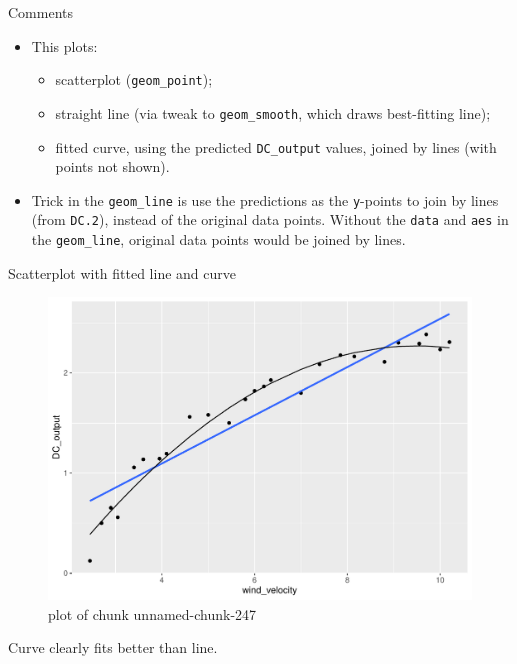 \documentclass[ignorenonframetext,]{beamer}
\providecommand{\tightlist}{%
  \setlength{\itemsep}{0pt}\setlength{\parskip}{0pt}}
\begin{document}
\begin{frame}[fragile]{Comments}
\protect\hypertarget{comments-15}{}

\begin{itemize}
\tightlist
\item
  This plots:

  \begin{itemize}
  \tightlist
  \item
    scatterplot (\texttt{geom\_point});
  \item
    straight line (via tweak to \texttt{geom\_smooth}, which draws
    best-fitting line);
  \item
    fitted curve, using the predicted \texttt{DC\_output} values, joined
    by lines (with points not shown).
  \end{itemize}
\item
  Trick in the \texttt{geom\_line} is use the predictions as the
  \texttt{y}-points to join by lines (from \texttt{DC.2}), instead of
  the original data points. Without the \texttt{data} and \texttt{aes}
  in the \texttt{geom\_line}, original data points would be joined by
  lines.
\end{itemize}

\end{frame}

\begin{frame}{Scatterplot with fitted line and curve}
\protect\hypertarget{scatterplot-with-fitted-line-and-curve-1}{}

\begin{figure}
\centering
\includegraphics{figure/unnamed-chunk-247-1.pdf}
\caption{plot of chunk unnamed-chunk-247}
\end{figure}

Curve clearly fits better than line.

\end{frame}
\end{document}
